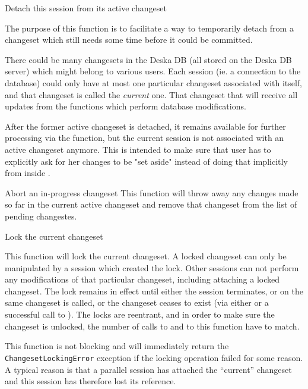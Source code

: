 \documentclass[deska]{subfiles}
\begin{document}
    {}
    {Detach this session from its active changeset}
    {The purpose of this function is to facilitate a way to temporarily detach from a changeset which still needs some
    time before it could be committed.

    There could be many changesets in the Deska DB (all stored on the Deska DB server) which might belong to various
    users.  Each session (ie. a connection to the database) could only have at most one particular changeset associated
    with itself, and that changeset is called the {\em current} one.  That changeset that will receive all updates from
    the functions which perform database modifications.

    After the former active changeset is detached, it remains available for further processing via the
     function, but the current session is not associated with an active changeset anymore.
    This is intended to make sure that user has to explicitly ask for her changes to be "set aside" instead of doing
    that implicitly from inside .}

    {Abort an in-progress changeset}
    {This function will throw away any changes made so far in the current active changeset and remove that changeset
    from the list of pending changestes.}

    {Lock the current changeset}
    {This function will lock the current changeset.  A locked changeset can only be manipulated by a session which
    created the lock.  Other sessions can not perform any modifications of that particular changeset, including attaching
    a locked changeset.  The lock remains in effect until either the session terminates, or
     on the same changeset is called, or the changeset ceases to exist (via either
     or a successful call to ).  The locks are
    reentrant, and in order to make sure the changeset is unlocked, the number of calls to
     and to this function have to match.

    This function is not blocking and will immediately return the {\tt ChangesetLockingError} exception if the locking
    operation failed for some reason.  A typical reason is that a parallel session has attached the ``current''
    changeset and this session has therefore lost its reference.}
\end{document}

